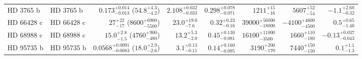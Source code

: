 \begin{longtable*}{llrrrrrr}
HD 3765 b & HD 3765 b & $0.173^{+0.014}_{-0.013}$ ($54.8^{+4.3}_{-4.2}$) & $2.108^{+0.032}_{-0.033}$ & $0.298^{+0.078}_{-0.071}$ & $1211^{+15}_{-16}$ & $5607^{+52}_{-54}$ & $-1.1^{+2.60}_{-0.32}$ \\ 
HD 66428 c & HD 66428 c & $27^{+22}_{-17}$ ($8600^{+6900}_{-5500}$) & $23.0^{+19.0}_{-7.6}$ & $0.32^{+0.23}_{-0.16}$ & $39000^{+56000}_{-18000}$ & $-4100^{+4600}_{-4500}$ & $0.5^{+0.65}_{-1.40}$ \\ 
HD 68988 c & HD 68988 c & $15.0^{+2.8}_{-1.5}$ ($4760^{+900}_{-480}$) & $13.2^{+5.3}_{-2.0}$ & $0.45^{+0.130}_{-0.081}$ & $16100^{+11000}_{-3500}$ & $1660^{+110}_{-180}$ & $-0.13^{+0.037}_{-0.043}$ \\ 
HD 95735 b & HD 95735 b & $0.0568^{+0.0091}_{-0.0083}$ ($18.0^{+2.9}_{-2.6}$) & $3.1^{+0.13}_{-0.11}$ & $0.14^{+0.160}_{-0.095}$ & $3190^{+200}_{-170}$ & $7440^{+150}_{-150}$ & $0.1^{+1.1}_{-1.3}$ \\ 
\bottomrule 
\end{longtable*} 

